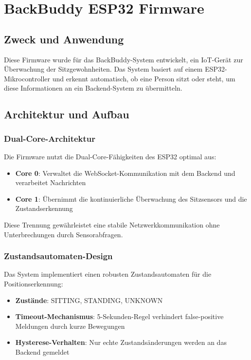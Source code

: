\newpage
\section{BackBuddy ESP32 Firmware}

\subsection{Zweck und Anwendung}

Diese Firmware wurde für das BackBuddy-System entwickelt, ein IoT-Gerät zur Überwachung der Sitzgewohnheiten. Das System basiert auf einem ESP32-Mikrocontroller und erkennt automatisch, ob eine Person sitzt oder steht, um diese Informationen an ein Backend-System zu übermitteln.

\subsection{Architektur und Aufbau}

\subsubsection{Dual-Core-Architektur}
Die Firmware nutzt die Dual-Core-Fähigkeiten des ESP32 optimal aus:

\begin{itemize}
\item \textbf{Core 0}: Verwaltet die WebSocket-Kommunikation mit dem Backend und verarbeitet Nachrichten
\item \textbf{Core 1}: Übernimmt die kontinuierliche Überwachung des Sitzsensors und die Zustandserkennung
\end{itemize}

Diese Trennung gewährleistet eine stabile Netzwerkkommunikation ohne Unterbrechungen durch Sensorabfragen.

\subsubsection{Zustandsautomaten-Design}
Das System implementiert einen robusten Zustandsautomaten für die Positionserkennung:

\begin{itemize}
\item \textbf{Zustände}: SITTING, STANDING, UNKNOWN
\item \textbf{Timeout-Mechanismus}: 5-Sekunden-Regel verhindert false-positive Meldungen durch kurze Bewegungen
\item \textbf{Hysterese-Verhalten}: Nur echte Zustandsänderungen werden an das Backend gemeldet
\end{itemize}

